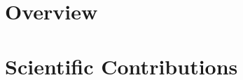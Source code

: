\documentclass[12pt]{book} %
\begin{document}
\frontmatter



\tableofcontents

\mainmatter
%
%
\part{\color{Maroon} Overview}
\label{part:1}



%
%



\part{\color{Maroon} Scientific Contributions}
\label{part:2}
\begin{appendices}
\end{appendices}

\newpage
\listoffigures

\let\cleardoublepage\clearpage

\newpage
\lstlistoflistings

\let\cleardoublepage\clearpage

\newpage
\listoftables

\backmatter
\end{document}
